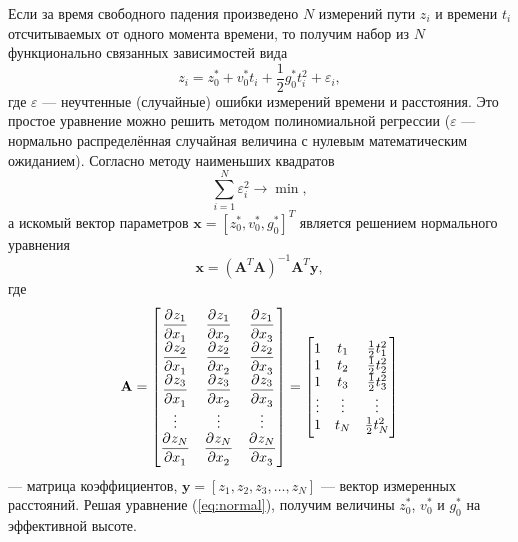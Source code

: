 \documentclass[12pt, a4paper]{article}
\theoremstyle{remark}
\renewcommand{\epsilon}{\ensuremath{\varepsilon}}
\begin{document}
Если за время свободного падения произведено $N$ измерений пути
$z_i$ и времени $t_i$ отсчитываемых от одного момента времени, 
то получим набор из $N$ функционально связанных зависимостей вида 
\begin{equation*}
    z_i = z_0^* + v_0^* t_i + \dfrac{1}{2} g_0^* t_i^2 + \epsilon_i,
\end{equation*}
где $\epsilon$ --- неучтенные (случайные) ошибки измерений времени и расстояния. Это простое
уравнение можно решить методом полиномиальной регрессии ($\epsilon$ --- нормально распределённая
случайная величина с нулевым математическим ожиданием). Согласно методу
наименьших квадратов
\begin{equation*}
    \sum\limits_{i = 1}^N\epsilon_i^2 \to \min,
\end{equation*}
а искомый вектор параметров $\mathbf{x} = \left[ z_0^*, v_0^*, g_0^* \right]^T$
является решением нормального уравнения
\begin{equation}
    \label{eq:normal}
    \mathbf{x} = \left( \mathbf{A}^T \mathbf{A} \right)^{-1}\mathbf{A}^T\mathbf{y},
\end{equation}
где 
\begin{equation*}
    \mathbf{A} =  
    \begin{bmatrix}
        \dpd{z_1}{x_1} & \dpd{z_1}{x_2} & \dpd{z_1}{x_3} \\
        \dpd{z_2}{x_1} & \dpd{z_2}{x_2} & \dpd{z_2}{x_3} \\
        \dpd{z_3}{x_1} & \dpd{z_3}{x_2} & \dpd{z_3}{x_3} \\
        \vdots & \vdots & \vdots \\
        \dpd{z_N}{x_1} & \dpd{z_N}{x_2} & \dpd{z_N}{x_3}
    \end{bmatrix} =
    \begin{bmatrix}
        1 & t_1 & \frac{1}{2} t_1^2 \\
        1 & t_2 & \frac{1}{2} t_2^2 \\
        1 & t_3 & \frac{1}{2} t_3^2 \\
        \vdots & \vdots & \vdots \\
        1 & t_N & \frac{1}{2} t_N^2
    \end{bmatrix}
\end{equation*}
--- матрица коэффициентов, $\mathbf{y} = [z_1, z_2, z_3, \dots, z_N]$ --- вектор измеренных
расстояний. Решая уравнение (\ref{eq:normal}), получим величины $z_0^*$, $v_0^*$ и $g_0^*$ на
эффективной высоте.
\end{document}
